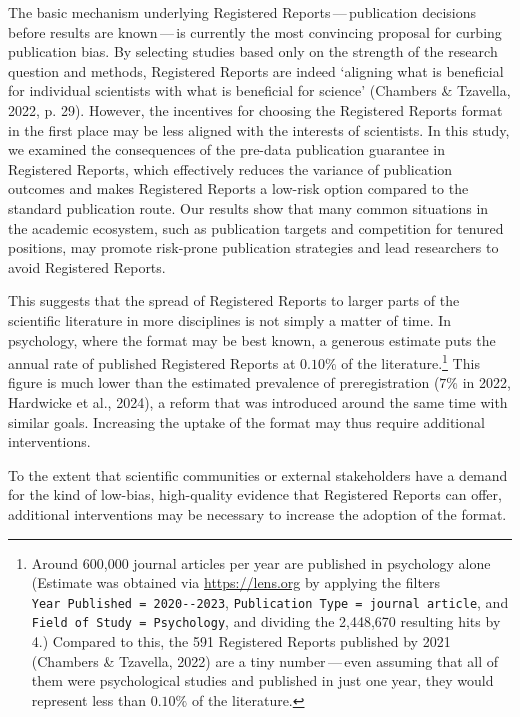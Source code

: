 \documentclass[
  ,man,mask,floatsintext]{apa6}
\begin{document}
The basic mechanism underlying Registered Reports\(\,\)---\(\,\)publication decisions before results are known\(\,\)---\(\,\)is currently the most convincing proposal for curbing publication bias.
By selecting studies based only on the strength of the research question and methods, Registered Reports are indeed `aligning what is beneficial for individual scientists with what is beneficial for science' (Chambers \& Tzavella, 2022, p. 29).
However, the incentives for choosing the Registered Reports format in the first place may be less aligned with the interests of scientists.
In this study, we examined the consequences of
the pre-data publication guarantee in Registered Reports, which effectively reduces the variance of publication outcomes and makes Registered Reports a low-risk option compared to the standard publication route.
Our results show that many common situations in the academic ecosystem, such as publication targets and competition for tenured positions, may promote risk-prone publication strategies and lead researchers to avoid Registered Reports.

This suggests that the spread of Registered Reports to larger parts of the scientific literature in more disciplines is not simply a matter of time.
In psychology, where the format may be best known, a generous estimate puts the annual rate of published Registered Reports at \(0.10\%\) of the literature.\footnote{Around 600,000 journal articles per year are published in psychology alone (Estimate was obtained via \url{https://lens.org} by applying the filters \texttt{Year\ Published\ =\ 2020-\/-2023}, \texttt{Publication\ Type\ =\ journal\ article}, and \texttt{Field\ of\ Study\ =\ Psychology}, and dividing the 2,448,670 resulting hits by 4.) Compared to this, the 591 Registered Reports published by 2021 (Chambers \& Tzavella, 2022) are a tiny number\(\,\)---\(\,\)even assuming that all of them were psychological studies and published in just one year, they would represent less than \(0.10\%\) of the literature.}
This figure is much lower than the estimated prevalence of preregistration (\(7\%\) in 2022, Hardwicke et al., 2024), a reform that was introduced around the same time with similar goals.
Increasing the uptake of the format may thus require additional interventions.

To the extent that scientific communities or external stakeholders have a demand for the kind of low-bias, high-quality evidence that Registered Reports can offer, additional interventions may be necessary to increase the adoption of the format.
\end{document}
